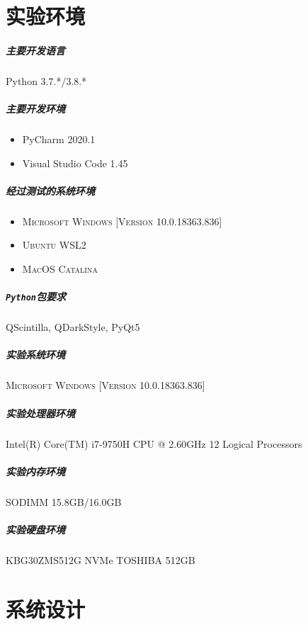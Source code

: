 \documentclass[UTF8]{ctexrep} %
\begin{document}
\chapter{实验环境}
\paragraph{主要开发语言}Python 3.7.*/3.8.*
\paragraph{主要开发环境}
\begin{itemize}
    \item PyCharm 2020.1
    \item Visual Studio Code 1.45
\end{itemize}
\paragraph{经过测试的系统环境}
\begin{itemize}
    \item \textsc{Microsoft Windows [Version 10.0.18363.836]}
    \item \textsc{Ubuntu WSL2}
    \item \textsc{MacOS Catalina}
\end{itemize}
\paragraph{\texttt{Python}包要求}QScintilla, QDarkStyle, PyQt5
\paragraph{实验系统环境} \textsc{Microsoft Windows [Version 10.0.18363.836]}
\paragraph{实验处理器环境} Intel(R) Core(TM) i7-9750H CPU @ 2.60GHz 12 Logical Processors
\paragraph{实验内存环境} SODIMM 15.8GB/16.0GB
\paragraph{实验硬盘环境} KBG30ZMS512G NVMe TOSHIBA 512GB

\chapter{系统设计}
\end{document}
